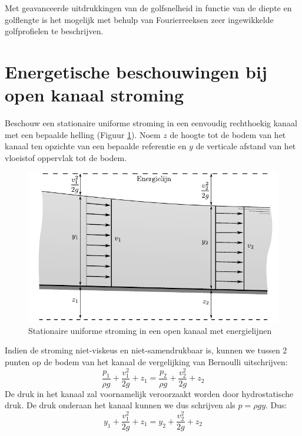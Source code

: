 Met geavanceerde uitdrukkingen van de golfsnelheid in functie van de diepte en golflengte is het mogelijk met behulp van Fourierreeksen zeer ingewikkelde golfprofielen te beschrijven.

	\section{Energetische beschouwingen bij open kanaal stroming}
	\label{sec:Energetische beschouwingen bij open kanaal stroming}
Beschouw een stationaire uniforme stroming in een eenvoudig rechthoekig kanaal met een bepaalde helling (Figuur \ref{fig:Open_kanaal_bernoulli}). Noem $z$ de hoogte tot de bodem van het kanaal ten opzichte van een bepaalde referentie en $y$ de verticale afstand van het vloeistof oppervlak tot de bodem.
\begin{figure}[htb]
	\centering
	\includegraphics{fig/kanaalstroming/Open_kanaal_bernoulli}
	\caption{Stationaire uniforme stroming in een open kanaal met energielijnen}
	\label{fig:Open_kanaal_bernoulli}
\end{figure}
Indien de stroming niet-viskeus en niet-samendrukbaar is, kunnen we tussen 2 punten op de bodem van het kanaal de vergelijking van Bernoulli uitschrijven:
\begin{equation}
	\frac{p_1}{\rho g} + \frac{v_1^2}{2 g} + z_1 = \frac{p_2}{\rho g} + \frac{v_2^2}{2 g} + z_2
\end{equation}
De druk in het kanaal zal voornamelijk veroorzaakt worden door hydrostatische druk. De druk onderaan het kanaal kunnen we dus schrijven als $p = \rho g y$. Dus:
\begin{equation}
	y_1 + \frac{v_1^2}{2 g} + z_1 = y_2 + \frac{v_2^2}{2 g} + z_2
\end{equation}
